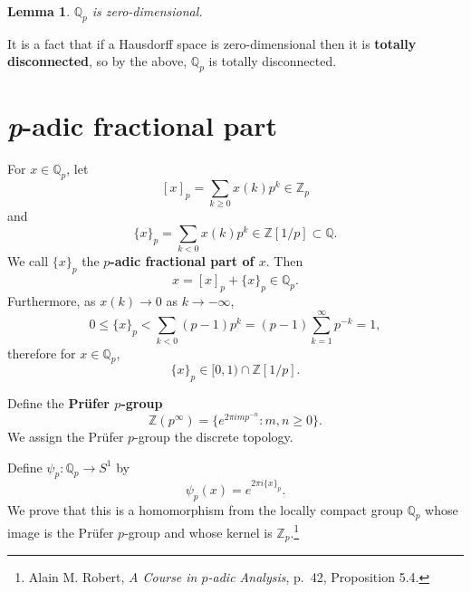 \documentclass{article}
\newtheorem{lemma}[theorem]{Lemma}
\theoremstyle{definition}
\begin{document}
\begin{lemma}
$\mathbb{Q}_p$ is zero-dimensional.
\end{lemma}

It is a fact that if a Hausdorff space is zero-dimensional then it is \textbf{totally disconnected}, so
by the above, $\mathbb{Q}_p$ is totally disconnected.



\section{{\em p}-adic fractional part}
For $x \in \mathbb{Q}_p$, let 
\[
[x]_p = \sum_{k \geq 0} x(k) p^k \in \mathbb{Z}_p
\]
and
\[
\{x\}_p = \sum_{k<0} x(k) p^k \in \mathbb{Z}[1/p] \subset \mathbb{Q}.
\]
We call $\{x\}_p$ the \textbf{$p$-adic fractional part of $x$}.
Then 
\[
x = [x]_p + \{x\}_p \in \mathbb{Q}_p.
\]
Furthermore, as $x(k) \to 0$ as $k \to -\infty$,
\[
0 \leq \{x\}_p < \sum_{k<0} (p-1)p^k = (p-1) \sum_{k=1}^\infty p^{-k} = 1,
\] 
therefore for $x \in \mathbb{Q}_p$,
\[
\{x\}_p \in [0,1) \cap \mathbb{Z}[1/p].
\]

Define the \textbf{Pr\"ufer $p$-group}
\[
\mathbb{Z}(p^\infty) = \{e^{2\pi im p^{-n}} : m,n \geq 0\}.
\]
We assign the Pr\"ufer $p$-group the discrete topology.



Define $\psi_p:\mathbb{Q}_p \to S^1$ by
\[
\psi_p(x) = e^{2\pi i\{x\}_p}.
\]
We prove that this is a homomorphism from the locally compact group $\mathbb{Q}_p$ whose
image is the Pr\"ufer $p$-group and whose kernel is $\mathbb{Z}_p$.\footnote{Alain M. Robert, {\em A Course in $p$-adic Analysis}, p.~42, Proposition 5.4.}
\end{document}

